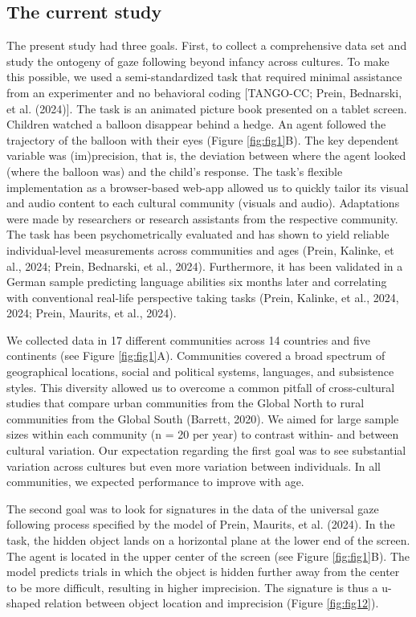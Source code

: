 \documentclass[
  man,floatsintext]{apa7}
\begin{document}
\hypertarget{the-current-study}{%
\subsection{The current study}\label{the-current-study}}

The present study had three goals. First, to collect a comprehensive data set and study the ontogeny of gaze following beyond infancy across cultures. To make this possible, we used a semi-standardized task that required minimal assistance from an experimenter and no behavioral coding {[}TANGO-CC; Prein, Bednarski, et al. (2024){]}. The task is an animated picture book presented on a tablet screen. Children watched a balloon disappear behind a hedge. An agent followed the trajectory of the balloon with their eyes (Figure \ref{fig:fig1}B). The key dependent variable was (im)precision, that is, the deviation between where the agent looked (where the balloon was) and the child's response. The task's flexible implementation as a browser-based web-app allowed us to quickly tailor its visual and audio content to each cultural community (visuals and audio). Adaptations were made by researchers or research assistants from the respective community. The task has been psychometrically evaluated and has shown to yield reliable individual-level measurements across communities and ages (Prein, Kalinke, et al., 2024; Prein, Bednarski, et al., 2024). Furthermore, it has been validated in a German sample predicting language abilities six months later and correlating with conventional real-life perspective taking tasks (Prein, Kalinke, et al., 2024, 2024; Prein, Maurits, et al., 2024).

We collected data in 17 different communities across 14 countries and five continents (see Figure \ref{fig:fig1}A). Communities covered a broad spectrum of geographical locations, social and political systems, languages, and subsistence styles. This diversity allowed us to overcome a common pitfall of cross-cultural studies that compare urban communities from the Global North to rural communities from the Global South (Barrett, 2020). We aimed for large sample sizes within each community (n = 20 per year) to contrast within- and between cultural variation. Our expectation regarding the first goal was to see substantial variation across cultures but even more variation between individuals. In all communities, we expected performance to improve with age.

The second goal was to look for signatures in the data of the universal gaze following process specified by the model of Prein, Maurits, et al. (2024). In the task, the hidden object lands on a horizontal plane at the lower end of the screen. The agent is located in the upper center of the screen (see Figure \ref{fig:fig1}B). The model predicts trials in which the object is hidden further away from the center to be more difficult, resulting in higher imprecision. The signature is thus a u-shaped relation between object location and imprecision (Figure \ref{fig:fig12}).
\end{document}
